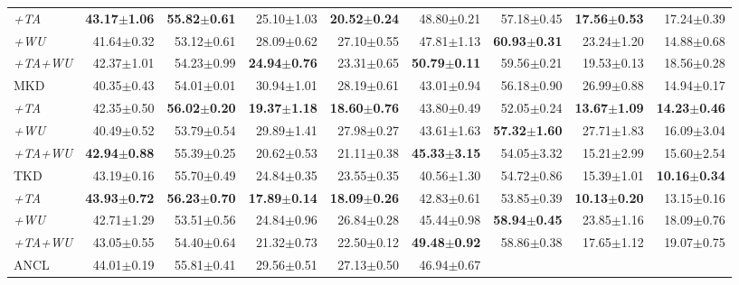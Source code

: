 \begin{appendix}
\begin{table*}[!th]
{\begin{tabular}{@{}lrrrrrrrr@{}}
\textit{+TA} &
  \textbf{43.17$\pm$1.06} &
  \textbf{55.82$\pm$0.61} &
  25.10$\pm$1.03 &
  \textbf{20.52$\pm$0.24} &
  48.80$\pm$0.21 &
  57.18$\pm$0.45 &
  \textbf{17.56$\pm$0.53} &
  17.24$\pm$0.39 \\
\textit{+WU} &
  41.64$\pm$0.32 &
  53.12$\pm$0.61 &
  28.09$\pm$0.62 &
  27.10$\pm$0.55 &
  47.81$\pm$1.13 &
  \textbf{60.93$\pm$0.31} &
  23.24$\pm$1.20 &
  14.88$\pm$0.68 \\
\textit{+TA+WU} &
  42.37$\pm$1.01 &
  54.23$\pm$0.99 &
  \textbf{24.94$\pm$0.76} &
  23.31$\pm$0.65 &
  \textbf{50.79$\pm$0.11} &
  59.56$\pm$0.21 &
  19.53$\pm$0.13 &
  18.56$\pm$0.28 \\ \midrule
MKD &
  40.35$\pm$0.43 &
  54.01$\pm$0.01 &
  30.94$\pm$1.01 &
  28.19$\pm$0.61 &
  43.01$\pm$0.94 &
  56.18$\pm$0.90 &
  26.99$\pm$0.88 &
  14.94$\pm$0.17 \\
\textit{+TA} &
  42.35$\pm$0.50 &
  \textbf{56.02$\pm$0.20} &
  \textbf{19.37$\pm$1.18} &
  \textbf{18.60$\pm$0.76} &
  43.80$\pm$0.49 &
  52.05$\pm$0.24 &
  \textbf{13.67$\pm$1.09} &
  \textbf{14.23$\pm$0.46} \\
\textit{+WU} &
  40.49$\pm$0.52 &
  53.79$\pm$0.54 &
  29.89$\pm$1.41 &
  27.98$\pm$0.27 &
  43.61$\pm$1.63 &
  \textbf{57.32$\pm$1.60} &
  27.71$\pm$1.83 &
  16.09$\pm$3.04 \\
\textit{+TA+WU} &
  \textbf{42.94$\pm$0.88} &
  55.39$\pm$0.25 &
  20.62$\pm$0.53 &
  21.11$\pm$0.38 &
  \textbf{45.33$\pm$3.15} &
  54.05$\pm$3.32 &
  15.21$\pm$2.99 &
  15.60$\pm$2.54 \\ \midrule
TKD &
  43.19$\pm$0.16 &
  55.70$\pm$0.49 &
  24.84$\pm$0.35 &
  23.55$\pm$0.35 &
  40.56$\pm$1.30 &
  54.72$\pm$0.86 &
  15.39$\pm$1.01 &
  \textbf{10.16$\pm$0.34} \\
\textit{+TA} &
  \textbf{43.93$\pm$0.72} &
  \textbf{56.23$\pm$0.70} &
  \textbf{17.89$\pm$0.14} &
  \textbf{18.09$\pm$0.26} &
  42.83$\pm$0.61 &
  53.85$\pm$0.39 &
  \textbf{10.13$\pm$0.20} &
  13.15$\pm$0.16 \\
\textit{+WU} &
  42.71$\pm$1.29 &
  53.51$\pm$0.56 &
  24.84$\pm$0.96 &
  26.84$\pm$0.28 &
  45.44$\pm$0.98 &
  \textbf{58.94$\pm$0.45} &
  23.85$\pm$1.16 &
  18.09$\pm$0.76 \\
\textit{+TA+WU} &
  43.05$\pm$0.55 &
  54.40$\pm$0.64 &
  21.32$\pm$0.73 &
  22.50$\pm$0.12 &
  \textbf{49.48$\pm$0.92} &
  58.86$\pm$0.38 &
  17.65$\pm$1.12 &
  19.07$\pm$0.75 \\ \midrule
ANCL &
  44.01$\pm$0.19 &
  55.81$\pm$0.41 &
  29.56$\pm$0.51 &
  27.13$\pm$0.50 &
  46.94$\pm$0.67 &

\end{tabular}}
\end{table*}
\end{appendix}

